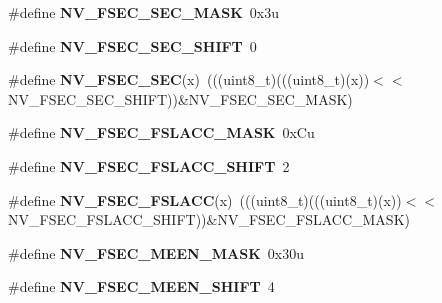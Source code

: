 \begin{DoxyCompactItemize}
\item 
\mbox{\label{group___n_v___register___masks_gab159c721c6cde1f629b630c573da8ea9}} 
\#define {\bfseries N\+V\+\_\+\+F\+S\+E\+C\+\_\+\+S\+E\+C\+\_\+\+M\+A\+SK}~0x3u
\item 
\mbox{\label{group___n_v___register___masks_ga92a819b24b0472a83857ddd2d950ab08}} 
\#define {\bfseries N\+V\+\_\+\+F\+S\+E\+C\+\_\+\+S\+E\+C\+\_\+\+S\+H\+I\+FT}~0
\item 
\mbox{\label{group___n_v___register___masks_ga285ae0f5ea99f97dfae69dc7affebcde}} 
\#define {\bfseries N\+V\+\_\+\+F\+S\+E\+C\+\_\+\+S\+EC}(x)~(((uint8\+\_\+t)(((uint8\+\_\+t)(x))$<$$<$N\+V\+\_\+\+F\+S\+E\+C\+\_\+\+S\+E\+C\+\_\+\+S\+H\+I\+FT))\&N\+V\+\_\+\+F\+S\+E\+C\+\_\+\+S\+E\+C\+\_\+\+M\+A\+SK)
\item 
\mbox{\label{group___n_v___register___masks_ga8fd3b6696c82aa96017fe25be34d19c9}} 
\#define {\bfseries N\+V\+\_\+\+F\+S\+E\+C\+\_\+\+F\+S\+L\+A\+C\+C\+\_\+\+M\+A\+SK}~0x\+Cu
\item 
\mbox{\label{group___n_v___register___masks_gaba549ee99b8ca1af3531eafd5746f6b6}} 
\#define {\bfseries N\+V\+\_\+\+F\+S\+E\+C\+\_\+\+F\+S\+L\+A\+C\+C\+\_\+\+S\+H\+I\+FT}~2
\item 
\mbox{\label{group___n_v___register___masks_ga75d524350a710ba87a95c927466a42d2}} 
\#define {\bfseries N\+V\+\_\+\+F\+S\+E\+C\+\_\+\+F\+S\+L\+A\+CC}(x)~(((uint8\+\_\+t)(((uint8\+\_\+t)(x))$<$$<$N\+V\+\_\+\+F\+S\+E\+C\+\_\+\+F\+S\+L\+A\+C\+C\+\_\+\+S\+H\+I\+FT))\&N\+V\+\_\+\+F\+S\+E\+C\+\_\+\+F\+S\+L\+A\+C\+C\+\_\+\+M\+A\+SK)
\item 
\mbox{\label{group___n_v___register___masks_ga02f5aa86e1f5bceefd0378fa736d5656}} 
\#define {\bfseries N\+V\+\_\+\+F\+S\+E\+C\+\_\+\+M\+E\+E\+N\+\_\+\+M\+A\+SK}~0x30u
\item 
\mbox{\label{group___n_v___register___masks_ga13adfbdf46af9e59b446d17ce90b49c1}} 
\#define {\bfseries N\+V\+\_\+\+F\+S\+E\+C\+\_\+\+M\+E\+E\+N\+\_\+\+S\+H\+I\+FT}~4

\end{DoxyCompactItemize}
